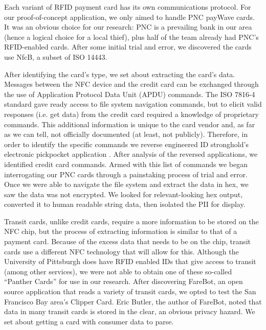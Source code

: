 \documentclass{IEEEtran}
\begin{document}
Each variant of RFID payment card has its own communications protocol.  For our proof-of-concept application, we only aimed to handle PNC payWave cards.  It was an obvious choice for our research: PNC is a prevailing bank in our area (hence a logical choice for a local thief), plus half of the team already had PNC's RFID-enabled cards.  After some initial trial and error, we discovered the cards use NfcB, a subset of ISO 14443.  

After identifying the card's type, we set about extracting the card's data. Messages between the NFC device and the credit card can be exchanged through the use of Application Protocol Data Unit (APDU) commands. The ISO 7816-4 standard gave ready access to file system navigation commands, but to elicit valid responses (i.e. get data) from the credit card required a knowledge of proprietary commands. This additional information is unique to the card vendor and, as far as we can tell, not officially documented (at least, not publicly). Therefore, in order to identify the specific commands we reverse engineered ID stronghold's electronic pickpocket application \cite{idstronghold-1}. After analysis of the reversed applications, we identified credit card commands.  Armed with this list of commands we began interrogating our PNC cards through a painstaking process of trial and error.  Once we were able to navigate the file system and extract the data in hex, we saw the data was not encrypted.  We looked for relevant-looking hex output, converted it to human readable string data, then isolated the PII for display.     

Transit cards, unlike credit cards, require a more information to be stored on the NFC chip, but the process of extracting information is similar to that of a payment card.  Because of the excess data that needs to be on the chip, transit cards use a different NFC technology that will allow for this.  Although the University of Pittsburgh does have RFID enabled IDs that give access to transit (among other services), \cite{pittcard-1} we were not able to obtain one of these so-called ``Panther Cards'' for use in our research.  After discovering FareBot, an open source application \cite{farebot-1} that reads a variety of transit cards, we opted to test the San Francisco Bay area's Clipper Card.  Eric Butler, the author of FareBot, noted that data in many transit cards is stored in the clear, an obvious privacy hazard.  We set about getting a card with consumer data to parse.  
\end{document}
